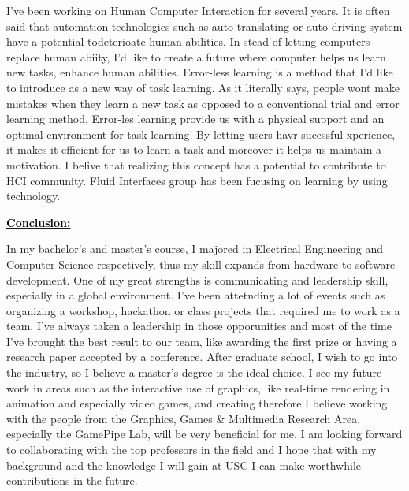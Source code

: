 \documentclass{article}
\newcommand{\statement}[1]{\par\medskip
  \underline{\textcolor{black}{\textbf{#1:}}}\space
}
\begin{document}
I've been working on Human Computer Interaction for several years. It is often said that automation technologies such as auto-translating or auto-driving  system have a potential todeterioate human abilities. In stead of letting computers replace human abiity, I'd like to create a future where computer helps us learn new tasks, enhance human abilities. Error-less learning is a method that I'd like to introduce as a new way of task learning. As it literally says, people wont make mistakes when they learn a new task as opposed to a conventional trial and error learning method. Error-les learning provide us with a physical support and an optimal environment for task learning. By letting users havr sucessful xperience, it makes it efficient for us to learn a task and moreover it helps us maintain a motivation. I belive that realizing this concept  has a potential to contribute to HCI community. Fluid Interfaces group has been fucusing on learning by using technology. 

\statement{Conclusion}
In my bachelor's and master's course, I majored in Electrical Engineering and Computer Science respectively,  thus my skill expands from hardware to software development.
One of my great strengths is communicating and leadership skill, especially in a global environment. I've been attetnding a lot of events such as organizing a workshop, hackathon or class projects that required me to work as a team. I've always taken a leadership in those opporunities and most of the time I've brought the best result to our team, like awarding the first prize or having a research paper accepted by a conference. 
After graduate school, I wish to go into the industry, so I believe a master’s degree is the ideal choice. I see my future work in areas such as the interactive use of graphics, like real-time rendering in animation and especially video games, and creating therefore I believe working with the people from the Graphics, Games & Multimedia Research Area, especially the GamePipe Lab, will be very beneficial for me. I am looking forward to collaborating with the top professors in the field and I hope that with my background and the knowledge I will gain at USC I can make worthwhile contributions in the future.
\end{document}
